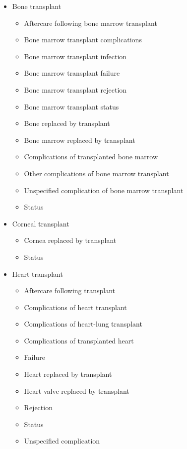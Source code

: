 \begin{itemize}
\begin{itemize}
        \item Bone transplant
        \begin{itemize}
            \item Aftercare following bone marrow transplant
            \item Bone marrow transplant complications
            \item Bone marrow transplant infection
            \item Bone marrow transplant failure
            \item Bone marrow transplant rejection
            \item Bone marrow transplant status
            \item Bone replaced by transplant
            \item Bone marrow replaced by transplant
            \item Complications of transplanted bone marrow
            \item Other complications of bone marrow transplant
            \item Unspecified complication of bone marrow transplant
            \item Status
        \end{itemize}
        
        \item Corneal transplant
        \begin{itemize}
            \item Cornea replaced by transplant
            \item Status
        \end{itemize}
        
        \item Heart transplant
        \begin{itemize}
            \item Aftercare following transplant
            \item Complications of heart transplant
            \item Complications of heart-lung transplant
            \item Complications of transplanted heart
            \item Failure
            \item Heart replaced by transplant
            \item Heart valve replaced by transplant
            \item Rejection
            \item Status
            \item Unspecified complication
        \end{itemize}
        

\end{itemize}
\end{itemize}
